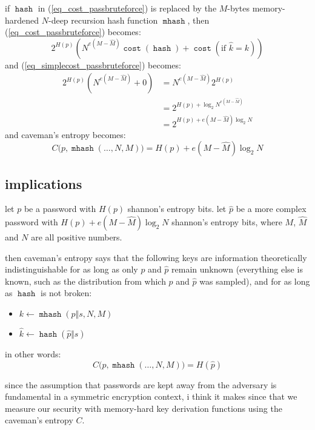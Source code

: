 \documentclass[twocolumn]{article}
\DeclareMathOperator{\hash}{\mathtt{hash}}
\DeclareMathOperator{\mhash}{\mathtt{mhash}}
\DeclareMathOperator{\cost}{\mathtt{cost}}
\begin{document}
if $\hash$ in (\ref{eq_cost_passbruteforce}) is replaced by the $M$-bytes
memory-hardened $N$-deep recursion hash function $\mhash$, then
(\ref{eq_cost_passbruteforce}) becomes:
\begin{equation}\label{eq_cost_passbruteforce_NM}
    2^{H(p)} \left(
        N^{e(M-\hat M)}\cost(\hash) + \cost(\text{if } \hat k = k)
    \right)
\end{equation}
and (\ref{eq_simplecost_passbruteforce}) becomes:
\begin{equation}\label{eq_simplecost_passbruteforce_NM}
    \begin{split}
    2^{H(p)} (N^{e(M-\hat M)}+0) &= N^{e(M-\hat M)} 2^{H(p)} \\
                  &= 2^{H(p) + \log_2 N^{e(M-\hat M)}} \\
                  &= 2^{H(p) + e(M-\hat M)\log_2 N}
    \end{split}
\end{equation}
and caveman's entropy becomes:
\begin{equation}
    C\Big(p, \mhash(\ldots, N, M)\Big) = H(p) + e(M-\hat M)\log_2 N
\end{equation}

\subsection{implications}
let $p$ be a password with $H(p)$ shannon's entropy bits.  let $\hat p$ be
a more complex password with $H(p) + e(M-\hat M)\log_2 N$ shannon's entropy
bits, where $M$, $\hat M$ and $N$ are all positive numbers.

then caveman's entropy says that the following keys are information
theoretically indistinguishable for as long as only $p$ and $\hat p$ remain
unknown (everything else is known, such as the distribution from which $p$
and $\hat p$ was sampled), and for as long as $\hash$ is not broken:
\begin{itemize}
    \item $k \gets \mhash(p \Vert s, N, M)$
    \item $\hat k \gets \hash(\hat p \Vert s)$
\end{itemize}

in other words:
\begin{equation}
    C\Big(p, \mhash(\ldots, N, M)\Big) = H(\hat p)
\end{equation}

since the assumption that passwords are kept away from the adversary is
fundamental in a symmetric encryption context, i think it makes since that
we measure our security with memory-hard key derivation functions using the
caveman's entropy $C$.
\end{document}
